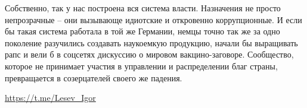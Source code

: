 Собственно, так у нас построена вся система власти. Назначения не просто
непрозрачные – они вызывающе идиотские и откровенно коррупционные. И если бы
такая система работала в той же Германии, немцы точно так же за одно поколение
разучились создавать наукоемкую продукцию, начали бы выращивать рапс и вели б в
соцсетях дискуссию о мировом вакцино-заговоре. Сообщество, которое не принимает
участия в управлении и распределении благ страны, превращается в созерцателей
своего же падения.

\url{https://t.me/Lesev_Igor}
